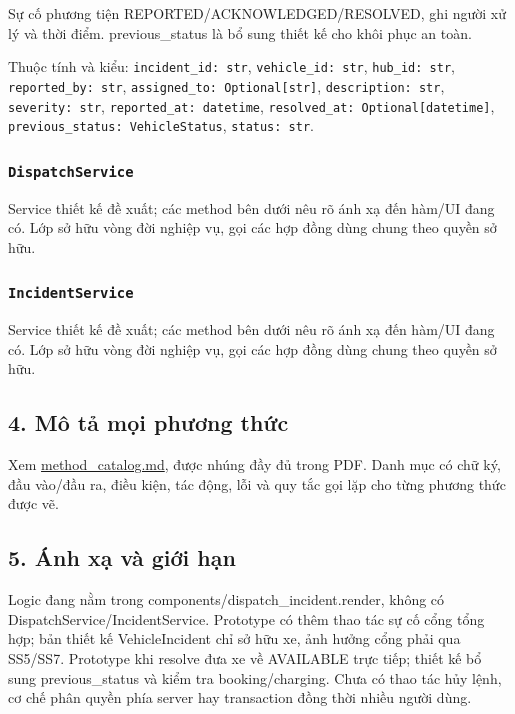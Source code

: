 \documentclass[11pt,a4paper]{article}
\begin{document}
Sự cố phương tiện REPORTED/ACKNOWLEDGED/RESOLVED, ghi người xử lý và
thời điểm. previous\_status là bổ sung thiết kế cho khôi phục an toàn.

Thuộc tính và kiểu: \texttt{incident\_id:\ str},
\texttt{vehicle\_id:\ str}, \texttt{hub\_id:\ str},
\texttt{reported\_by:\ str}, \texttt{assigned\_to:\ Optional{[}str{]}},
\texttt{description:\ str}, \texttt{severity:\ str},
\texttt{reported\_at:\ datetime},
\texttt{resolved\_at:\ Optional{[}datetime{]}},
\texttt{previous\_status:\ VehicleStatus}, \texttt{status:\ str}.

\hypertarget{dispatchservice}{%
\subsubsection{\texorpdfstring{\texttt{DispatchService}}{DispatchService}}\label{dispatchservice}}

Service thiết kế đề xuất; các method bên dưới nêu rõ ánh xạ đến hàm/UI
đang có. Lớp sở hữu vòng đời nghiệp vụ, gọi các hợp đồng dùng chung theo
quyền sở hữu.

\hypertarget{incidentservice}{%
\subsubsection{\texorpdfstring{\texttt{IncidentService}}{IncidentService}}\label{incidentservice}}

Service thiết kế đề xuất; các method bên dưới nêu rõ ánh xạ đến hàm/UI
đang có. Lớp sở hữu vòng đời nghiệp vụ, gọi các hợp đồng dùng chung theo
quyền sở hữu.

\hypertarget{muxf4-tux1ea3-mux1ecdi-phux1b0ux1a1ng-thux1ee9c}{%
\subsection{4. Mô tả mọi phương
thức}\label{muxf4-tux1ea3-mux1ecdi-phux1b0ux1a1ng-thux1ee9c}}

Xem \url{method_catalog.md}, được nhúng đầy đủ trong PDF. Danh mục có
chữ ký, đầu vào/đầu ra, điều kiện, tác động, lỗi và quy tắc gọi lặp cho
từng phương thức được vẽ.

\hypertarget{uxe1nh-xux1ea1-vuxe0-giux1edbi-hux1ea1n}{%
\subsection{5. Ánh xạ và giới
hạn}\label{uxe1nh-xux1ea1-vuxe0-giux1edbi-hux1ea1n}}

Logic đang nằm trong components/dispatch\_incident.render, không có
DispatchService/IncidentService. Prototype có thêm thao tác sự cố cổng
tổng hợp; bản thiết kế VehicleIncident chỉ sở hữu xe, ảnh hưởng cổng
phải qua SS5/SS7. Prototype khi resolve đưa xe về AVAILABLE trực tiếp;
thiết kế bổ sung previous\_status và kiểm tra booking/charging. Chưa có
thao tác hủy lệnh, cơ chế phân quyền phía server hay transaction đồng
thời nhiều người dùng.
\end{document}
